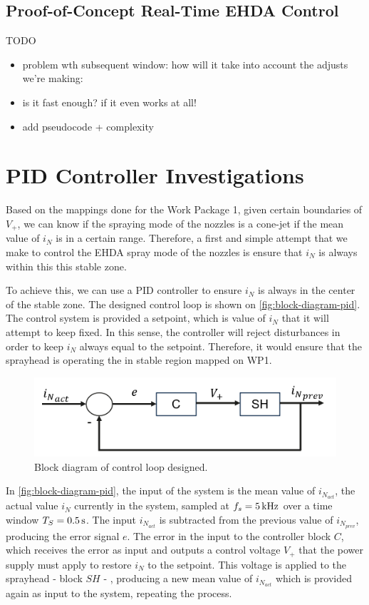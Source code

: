 \documentclass[oneside,12pt]{article}
\begin{document}
\subsection{Proof-of-Concept Real-Time EHDA Control}
TODO

\begin{itemize}
    \item problem wth subsequent window: how will it take into account the adjusts we're making:
    \item is it fast enough? if it even works at all!
    \item add pseudocode + complexity
\end{itemize}

\section{PID Controller Investigations}\label{sec:pid}

Based on the mappings done for the Work Package 1, given certain boundaries of $V_+$, we can know if the spraying mode of the nozzles
is a cone-jet if the mean value of $i_N$ is in a certain range. Therefore, a first and simple attempt that we make to control the EHDA
spray mode of the nozzles is ensure that $i_N$ is always within this this stable zone.

To achieve this, we can use a PID controller to ensure $i_N$ is always in the center of the stable zone. The designed control loop 
is shown on \autoref{fig:block-diagram-pid}. The control system is provided a setpoint, which is value of $i_N$ that it will attempt
to keep fixed. In this sense, the controller will reject disturbances in order to keep $i_N$ always equal to the setpoint.
Therefore, it would ensure that the sprayhead is operating the in stable region mapped on WP1. 

\begin{figure}[h!]
    \centering
    \includegraphics[width=.8\textwidth,trim=1 1 1 1,clip]{figures/block-diagram-pid.png}
    \caption{Block diagram of control loop designed.}
    \label{fig:block-diagram-pid}
\end{figure}

In \autoref{fig:block-diagram-pid}, the input of the system is the mean value of $i_{N_{act}}$, the actual value $i_N$ currently
in the system, sampled at $f_s = 5 \,\mathrm{kHz}$ over a time window
$T_S = 0.5 \,\mathrm{s}$. The input $i_{N_{act}}$ is subtracted from the previous value of $i_{N_{prev}}$, producing the error signal $e$. 
The error in the input to the controller block $C$, which receives the error as input and outputs a control voltage $V_+$ that the 
power supply must apply to restore $i_N$ to the setpoint. This voltage is applied to the sprayhead - block $SH$ - , producing a new mean value 
of $i_{N_{act}}$ which is provided again as input to the system, repeating the process.
\end{document}
